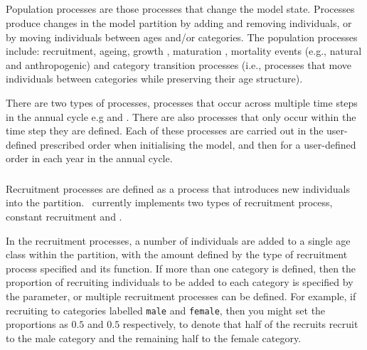 \subsection{}
Population processes are those processes that change the model state. Processes produce changes in the model partition by adding and removing individuals, or by moving individuals between ages and/or categories. The population processes include: recruitment, ageing,  growth , maturation , mortality events (e.g., natural and anthropogenic) and category transition processes (i.e., processes that move individuals between categories while preserving their age structure).

There are two types of processes, processes that occur across multiple time steps in the annual cycle e.g  and . There are also processes that only occur within the time step they are defined. Each of these processes are carried out in the user-defined prescribed order when initialising the model, and then for a user-defined order in each year in the annual cycle.

\subsubsection{}

Recruitment processes are defined as a process that introduces new individuals into the partition. \CNAME\ currently implements two types of recruitment process, constant recruitment and   \citep{1203}.

In the recruitment processes, a number of individuals are added to a single age class within the partition, with the amount defined by the type of recruitment process specified and its function. If more than one category is defined, then the proportion of recruiting individuals to be added to each category is specified by the  parameter, or multiple recruitment processes can be defined. For example, if recruiting to categories labelled \texttt{male} and \texttt{female}, then you might set the proportions as $0.5$ and $0.5$ respectively, to denote that half of the recruits recruit to the male category and the remaining half to the female category.


